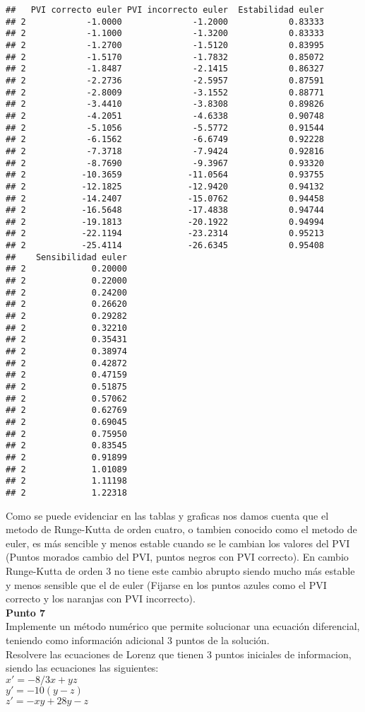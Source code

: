 \documentclass[]{article}
\begin{document}
\begin{verbatim}
##   PVI correcto euler PVI incorrecto euler  Estabilidad euler
## 2            -1.0000              -1.2000            0.83333
## 2            -1.1000              -1.3200            0.83333
## 2            -1.2700              -1.5120            0.83995
## 2            -1.5170              -1.7832            0.85072
## 2            -1.8487              -2.1415            0.86327
## 2            -2.2736              -2.5957            0.87591
## 2            -2.8009              -3.1552            0.88771
## 2            -3.4410              -3.8308            0.89826
## 2            -4.2051              -4.6338            0.90748
## 2            -5.1056              -5.5772            0.91544
## 2            -6.1562              -6.6749            0.92228
## 2            -7.3718              -7.9424            0.92816
## 2            -8.7690              -9.3967            0.93320
## 2           -10.3659             -11.0564            0.93755
## 2           -12.1825             -12.9420            0.94132
## 2           -14.2407             -15.0762            0.94458
## 2           -16.5648             -17.4838            0.94744
## 2           -19.1813             -20.1922            0.94994
## 2           -22.1194             -23.2314            0.95213
## 2           -25.4114             -26.6345            0.95408
##    Sensibilidad euler
## 2             0.20000
## 2             0.22000
## 2             0.24200
## 2             0.26620
## 2             0.29282
## 2             0.32210
## 2             0.35431
## 2             0.38974
## 2             0.42872
## 2             0.47159
## 2             0.51875
## 2             0.57062
## 2             0.62769
## 2             0.69045
## 2             0.75950
## 2             0.83545
## 2             0.91899
## 2             1.01089
## 2             1.11198
## 2             1.22318
\end{verbatim}

Como se puede evidenciar en las tablas y graficas nos damos cuenta que
el metodo de Runge-Kutta de orden cuatro, o tambien conocido como el
metodo de euler, es más sencible y menos estable cuando se le cambian
los valores del PVI (Puntos morados cambio del PVI, puntos negros con
PVI correcto). En cambio Runge-Kutta de orden 3 no tiene este cambio
abrupto siendo mucho más estable y menos sensible que el de euler
(Fijarse en los puntos azules como el PVI correcto y los naranjas con
PVI incorrecto).\\[2\baselineskip]\textbf{Punto
7}\\[2\baselineskip]Implemente un método numérico que permite solucionar
una ecuación diferencial, teniendo como información adicional 3 puntos
de la solución.\\[2\baselineskip]Resolvere las ecuaciones de Lorenz que
tienen 3 puntos iniciales de informacion, siendo las ecuaciones las
siguientes:\\
\(x' = -8/3x + yz\)\\
\(y'= -10(y-z)\)\\
\(z' = -xy+28y-z\)\\[2\baselineskip]
\end{document}
